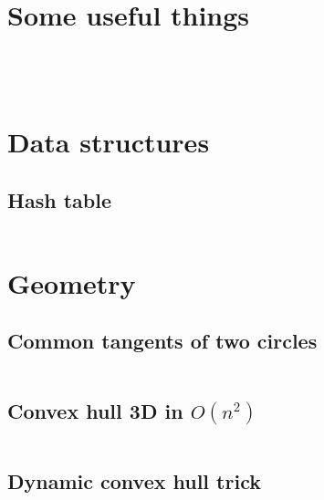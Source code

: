 \documentclass{article}
\begin{document}
\onecolumn
\tableofcontents

\twocolumn
\newpage

\section{Some useful things}
\inputminted[mathescape, breaklines, breakafter=(, tabsize=2, frame=lines, showtabs, tab=|\ , tabcolor=lightgray]{java}{./basic/Template.java}
\inputminted[mathescape, breaklines, breakafter=(, tabsize=2, frame=lines, showtabs, tab=|\ , tabcolor=lightgray]{c++}{./basic/io.cpp}
\inputminted[mathescape, breaklines, breakafter=(, tabsize=2, frame=lines, showtabs, tab=|\ , tabcolor=lightgray]{c++}{./basic/opt.cpp}
\inputminted[mathescape, breaklines, breakafter=(, tabsize=2, frame=lines, showtabs, tab=|\ , tabcolor=lightgray]{c++}{./basic/useful.cpp}
\section{Data structures}
\subsection{Hash table}
\inputminted[mathescape, breaklines, breakafter=(, tabsize=2, frame=lines, showtabs, tab=|\ , tabcolor=lightgray]{c++}{./data-structures/hash-table/hash-table.cpp}
\section{Geometry}
\subsection{Common tangents of two circles}
\inputminted[mathescape, breaklines, breakafter=(, tabsize=2, frame=lines, showtabs, tab=|\ , tabcolor=lightgray]{c++}{./geometry/common-tangents/common-tangents.cpp}
\subsection{Convex hull 3D in $O(n ^ 2)$}
\inputminted[mathescape, breaklines, breakafter=(, tabsize=2, frame=lines, showtabs, tab=|\ , tabcolor=lightgray]{c++}{./geometry/convex-hull-3d/convex-hull-3d.cpp}
\subsection{Dynamic convex hull trick}
\inputminted[mathescape, breaklines, breakafter=(, tabsize=2, frame=lines, showtabs, tab=|\ , tabcolor=lightgray]{c++}{./geometry/convex-hull-trick/convex-hull-trick.cpp}
\end{document}
